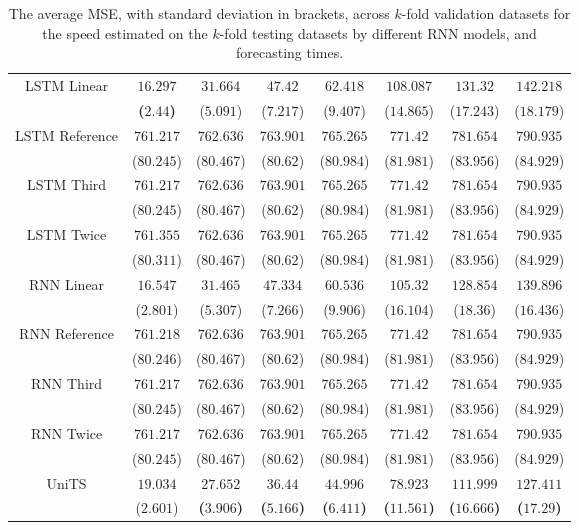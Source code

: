 \begin{table}[!ht]
{\begin{tabular}{|c|c|c|c|c|c|c|c|}
			\multirow{2}{*}{LSTM Linear} & $\mathbf{16.297}$ & $31.664$ & $47.42$ & $62.418$ & $108.087$ & $131.32$ & $142.218$ \\
			 & \textbf{(}$\mathbf{2.44}$\textbf{)} & ($5.091$) & ($7.217$) & ($9.407$) & ($14.865$) & ($17.243$) & ($18.179$) \\ \hline
			\multirow{2}{*}{LSTM Reference} & $761.217$ & $762.636$ & $763.901$ & $765.265$ & $771.42$ & $781.654$ & $790.935$ \\
			 & ($80.245$) & ($80.467$) & ($80.62$) & ($80.984$) & ($81.981$) & ($83.956$) & ($84.929$) \\ \hline
			\multirow{2}{*}{LSTM Third} & $761.217$ & $762.636$ & $763.901$ & $765.265$ & $771.42$ & $781.654$ & $790.935$ \\
			 & ($80.245$) & ($80.467$) & ($80.62$) & ($80.984$) & ($81.981$) & ($83.956$) & ($84.929$) \\ \hline
			\multirow{2}{*}{LSTM Twice} & $761.355$ & $762.636$ & $763.901$ & $765.265$ & $771.42$ & $781.654$ & $790.935$ \\
			 & ($80.311$) & ($80.467$) & ($80.62$) & ($80.984$) & ($81.981$) & ($83.956$) & ($84.929$) \\ \hline
			\multirow{2}{*}{RNN Linear} & $16.547$ & $31.465$ & $47.334$ & $60.536$ & $105.32$ & $128.854$ & $139.896$ \\
			 & ($2.801$) & ($5.307$) & ($7.266$) & ($9.906$) & ($16.104$) & ($18.36$) & ($16.436$) \\ \hline
			\multirow{2}{*}{RNN Reference} & $761.218$ & $762.636$ & $763.901$ & $765.265$ & $771.42$ & $781.654$ & $790.935$ \\
			 & ($80.246$) & ($80.467$) & ($80.62$) & ($80.984$) & ($81.981$) & ($83.956$) & ($84.929$) \\ \hline
			\multirow{2}{*}{RNN Third} & $761.217$ & $762.636$ & $763.901$ & $765.265$ & $771.42$ & $781.654$ & $790.935$ \\
			 & ($80.245$) & ($80.467$) & ($80.62$) & ($80.984$) & ($81.981$) & ($83.956$) & ($84.929$) \\ \hline
			\multirow{2}{*}{RNN Twice} & $761.217$ & $762.636$ & $763.901$ & $765.265$ & $771.42$ & $781.654$ & $790.935$ \\
			 & ($80.245$) & ($80.467$) & ($80.62$) & ($80.984$) & ($81.981$) & ($83.956$) & ($84.929$) \\ \hline
			\multirow{2}{*}{UniTS} & $19.034$ & $\mathbf{27.652}$ & $\mathbf{36.44}$ & $\mathbf{44.996}$ & $\mathbf{78.923}$ & $\mathbf{111.999}$ & $\mathbf{127.411}$ \\
			 & ($2.601$) & \textbf{(}$\mathbf{3.906}$\textbf{)} & \textbf{(}$\mathbf{5.166}$\textbf{)} & \textbf{(}$\mathbf{6.411}$\textbf{)} & \textbf{(}$\mathbf{11.561}$\textbf{)} & \textbf{(}$\mathbf{16.666}$\textbf{)} & \textbf{(}$\mathbf{17.29}$\textbf{)} \\ \hline
		\end{tabular}
	}
	\caption{The average MSE, with standard deviation in brackets, across $k$-fold validation datasets for the speed estimated on the $k$-fold testing datasets by different RNN models, and forecasting times.}
	\label{tab:all_speed_MSE}
\end{table}